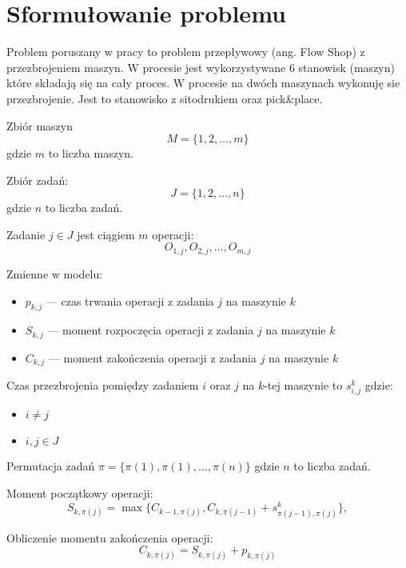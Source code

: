 \chapter{Sformułowanie problemu}
Problem poruszany w pracy to problem przepływowy (ang. Flow Shop) z przezbrojeniem maszyn.
W procesie jest wykorzystywane 6 stanowisk (maszyn) które składają się na cały proces.
W procesie na dwóch maszynach wykonuję sie przezbrojenie. Jest to stanowisko z sitodrukiem oraz pick\&place.

Zbiór maszyn
\begin{equation}
	M=\lbrace 1, 2, \dots, m \rbrace
\end{equation}
gdzie $m$ to liczba maszyn.

Zbiór zadań:
\begin{equation}
	J=\lbrace 1, 2, \dots, n \rbrace
\end{equation}
gdzie $n$ to liczba zadań.


Zadanie $j \in J$ jest ciągiem $m$ operacji:
\begin{equation}
	O_{1, j}, O_{2, j}, \dots, O_{m, j}
\end{equation}

Zmienne w modelu:
\begin{itemize}
	\item $p_{k, j}$ --- czas trwania operacji z zadania $j$ na maszynie $k$
	\item $S_{k, j}$ --- moment rozpoczęcia operacji z zadania $j$ na maszynie $k$
	\item $C_{k, j}$ --- moment zakończenia operacji z zadania $j$ na maszynie $k$
\end{itemize}

Czas przezbrojenia pomiędzy zadaniem $i$ oraz $j$ na $k$-tej maszynie to $s_{i, j}^{k}$ gdzie:
\begin{itemize}
	\item $i \neq j$
	\item  $i, j \in J$
\end{itemize}

Permutacja zadań $\pi = \lbrace \pi(1), \pi(1), \dots, \pi(n) \rbrace$ gdzie $n$ to liczba zadań.

Moment początkowy operacji:
\begin{equation}
	S_{k, \pi(j)}=\max\{C_{k-1, \pi(j)}, C_{k, \pi(j-1)}+s^k_{\pi(j-1), \pi(j)}\},
\end{equation}

Obliczenie momentu zakończenia operacji:
\begin{equation}
	C_{k, \pi(j)} = S_{k, \pi(j)} + p_{k, \pi(j)}
\end{equation}

